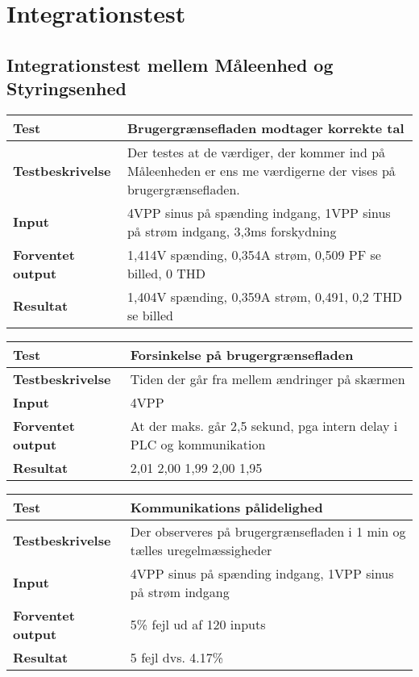 
\chapter{Integrationstest}

\section{Integrationstest mellem Måleenhed og Styringsenhed}

\begin{center}
	\begin{tabular}{ | m{} | m{}|} 
		\hline
		\textbf{Test}					&Brugergrænsefladen modtager korrekte tal \\ \hline
		\textbf{Testbeskrivelse}		&Der testes at de værdiger, der kommer ind på Måleenheden er ens me værdigerne der vises på brugergrænsefladen. \\ \hline
		\textbf{Input}					&4VPP sinus på spænding indgang, 1VPP sinus på strøm indgang, 3,3ms forskydning \\ \hline
		\textbf{Forventet output}		&1,414V spænding, 0,354A strøm, 0,509 PF se billed, 0 THD \\ \hline
		\textbf{Resultat}				&1,404V spænding, 0,359A strøm, 0,491, 0,2 THD  se billed  \\ \hline
	\end{tabular}
\end{center}

\begin{center}
	\begin{tabular}{ | m{} | m{}|} 
		\hline
		\textbf{Test}					&Forsinkelse på brugergrænsefladen \\ \hline
		\textbf{Testbeskrivelse}		&Tiden der går fra mellem ændringer på skærmen \\ \hline
		\textbf{Input}					&4VPP \\ \hline
		\textbf{Forventet output}		&At der maks. går 2,5 sekund, pga intern delay i PLC og kommunikation \\ \hline
		\textbf{Resultat}				&2,01 2,00 1,99 2,00 1,95   \\ \hline
	\end{tabular}
\end{center}


\begin{center}
	\begin{tabular}{ | m{} | m{}|} 
		\hline
		\textbf{Test}					&Kommunikations pålidelighed \\ \hline
		\textbf{Testbeskrivelse}		&Der observeres på brugergrænsefladen i 1 min og tælles uregelmæssigheder \\ \hline
		\textbf{Input}					&4VPP sinus på spænding indgang, 1VPP sinus på strøm indgang\\ \hline
		\textbf{Forventet output}		&5\% fejl ud af 120 inputs \\ \hline
		\textbf{Resultat}				&5 fejl dvs. 4.17\%  \\ \hline
	\end{tabular}
\end{center}
